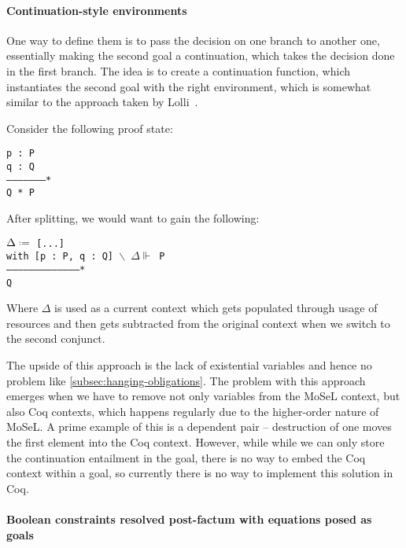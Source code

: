 \paragraph{Continuation-style environments}

One way to define them is to pass the decision on one branch to another one, essentially making the second goal a continuation, which takes the decision done in the first branch.
The idea is to create a continuation function, which instantiates the second goal with the right environment, which is somewhat similar to the approach taken by Lolli~\cite{LolliLinearLogic}.

Consider the following proof state:

\begin{minipage}{\linewidth}
\texttt{p : P\\
q : Q\\
--------------------*\\
Q * P
}
\end{minipage}

After splitting, we would want to gain the following:

\begin{minipage}{\linewidth}
\texttt{$\Delta \defeq$ [...]\\
with [p : P, q : Q] $\backslash \,\,\, \Delta \Vdash$ P\\
---------------------------------------*\\
Q
}
\end{minipage}

Where \(\Delta\) is used as a current context which gets populated through usage of resources and then gets subtracted from the original context when we switch to the second conjunct.

The upside of this approach is the lack of existential variables and hence no problem like \ref{subsec:hanging-obligations}.
The problem with this approach emerges when we have to remove not only variables from the MoSeL context, but also Coq contexts, which happens regularly due to the higher-order nature of MoSeL.
A prime example of this is a dependent pair -- destruction of one moves the first element into the Coq context.
However, while while we can only store the continuation entailment in the goal, there is no way to embed the Coq context within a goal, so currently there is no way to implement this solution in Coq.

\paragraph{Boolean constraints resolved post-factum with equations posed as goals}

